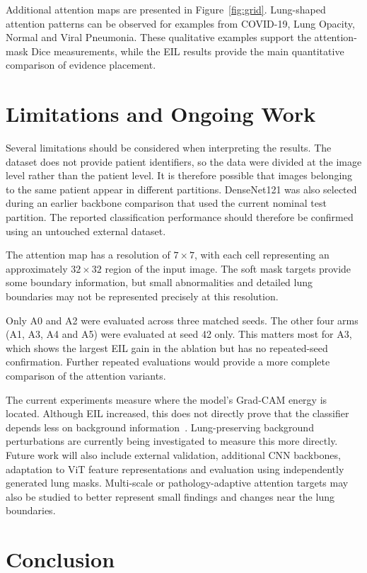 \documentclass[sigconf,screen,nonacm]{acmart}
\begin{document}
Additional attention maps are presented in Figure~\ref{fig:grid}. Lung-shaped attention patterns can be observed for examples from COVID-19, Lung Opacity, Normal and Viral Pneumonia. These qualitative examples support the attention-mask Dice measurements, while the EIL results provide the main quantitative comparison of evidence placement.

\section{Limitations and Ongoing Work}

Several limitations should be considered when interpreting the results. The dataset does not provide patient identifiers, so the data were divided at the image level rather than the patient level. It is therefore possible that images belonging to the same patient appear in different partitions. DenseNet121 was also selected during an earlier backbone comparison that used the current nominal test partition. The reported classification performance should therefore be confirmed using an untouched external dataset.

The attention map has a resolution of $7\times7$, with each cell representing an approximately $32\times32$ region of the input image. The soft mask targets provide some boundary information, but small abnormalities and detailed lung boundaries may not be represented precisely at this resolution.

Only A0 and A2 were evaluated across three matched seeds. The other four arms (A1, A3, A4 and A5) were evaluated at seed 42 only. This matters most for A3, which shows the largest EIL gain in the ablation but has no repeated-seed confirmation. Further repeated evaluations would provide a more complete comparison of the attention variants.

The current experiments measure where the model's Grad-CAM energy is located. Although EIL increased, this does not directly prove that the classifier depends less on background information~\cite{adebayo2018sanity}. Lung-preserving background perturbations are currently being investigated to measure this more directly. Future work will also include external validation, additional CNN backbones, adaptation to ViT feature representations and evaluation using independently generated lung masks. Multi-scale or pathology-adaptive attention targets may also be studied to better represent small findings and changes near the lung boundaries.

\section{Conclusion}
\end{document}
